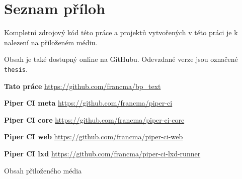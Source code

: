 
\chapter{Seznam příloh}

Kompletní zdrojový kód této práce a projektů vytvořených v této práci je k nalezení na přiloženém médiu.

Obsah je také dostupný online na GitHubu. 
Odevzdané verze jsou označené \texttt{thesis}.

\noindent \textbf{Tato práce} \hfill
\url{https://github.com/francma/bp_text}

\noindent \textbf{Piper CI meta} \hfill
\url{https://github.com/francma/piper-ci}

\noindent \textbf{Piper CI core} \hfill
\url{https://github.com/francma/piper-ci-core}
    
\noindent \textbf{Piper CI web} \hfill
\url{https://github.com/francma/piper-ci-web}

\noindent \textbf{Piper CI lxd} \hfill
\url{https://github.com/francma/piper-ci-lxd-runner}

\vfill

\begin{dirfigure}%
\caption{Obsah přiloženého média}
\end{dirfigure}